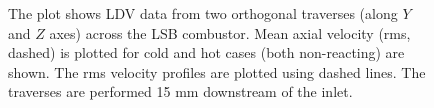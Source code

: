 \begin{figure}[h]

\centering



\caption[Effect of preheat temperature on the LSB flow field - II]{The plot shows LDV data from two orthogonal traverses (along \(Y\) and \(Z\) axes) across the LSB combustor. Mean axial velocity (rms, dashed) is plotted for cold and hot cases (both non-reacting) are shown. The rms velocity profiles are plotted using dashed lines. The traverses are performed 15 mm downstream of the inlet.}

\label{fig:temperatureLDVTransverse}

\end{figure}

